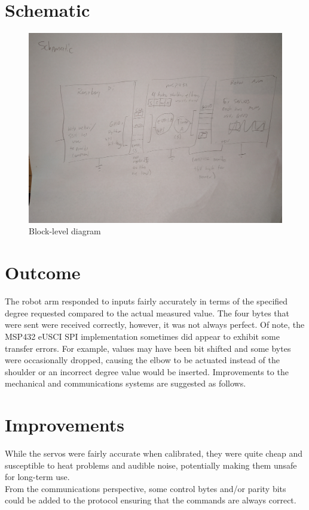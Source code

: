 \documentclass[10pt]{article}
\begin{document}
\section{Schematic}

\begin{figure}[htp]
\includegraphics[width=\linewidth]{IMG_20170507_211043}
\caption{Block-level diagram}
\end{figure}


\section{Outcome}

The robot arm responded to inputs fairly accurately in terms of the specified degree requested compared to the actual measured value. The four bytes that were sent were received correctly, however, it was not always perfect. Of note, the MSP432 eUSCI SPI implementation sometimes did appear to exhibit some transfer errors. For example, values may have been bit shifted and some bytes were occasionally dropped, causing the elbow to be actuated instead of the shoulder or an incorrect degree value would be inserted. Improvements to the mechanical and communications systems are suggested as follows.

\section{Improvements}
While the servos were fairly accurate when calibrated, they were quite cheap and susceptible to heat problems and audible noise, potentially making them unsafe for long-term use. \\ \newline
From the communications perspective, some control bytes and/or parity bits could be added to the protocol ensuring that the commands are always correct.
\end{document}
